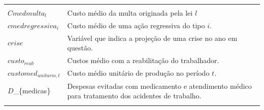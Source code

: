 \documentclass[]{article}
\begin{document}
\begin{longtable}[]{@{}ll@{}}
\begin{minipage}[t]{0.87\columnwidth}
\end{minipage}\tabularnewline
\begin{minipage}[t]{0.07\columnwidth}\raggedright\strut
\(Cmedmulta_{l}\)\strut
\end{minipage} & \begin{minipage}[t]{0.87\columnwidth}\raggedright\strut
Custo médio da multa originada pela lei \(l\)\strut
\end{minipage}\tabularnewline
\begin{minipage}[t]{0.07\columnwidth}\raggedright\strut
\(cmedregressiva_{i}\)\strut
\end{minipage} & \begin{minipage}[t]{0.87\columnwidth}\raggedright\strut
Custo médio de uma ação regressiva do tipo \(i\).\strut
\end{minipage}\tabularnewline
\begin{minipage}[t]{0.07\columnwidth}\raggedright\strut
\(crise\)\strut
\end{minipage} & \begin{minipage}[t]{0.87\columnwidth}\raggedright\strut
Variável que indica a projeção de uma crise no ano em questão.\strut
\end{minipage}\tabularnewline
\begin{minipage}[t]{0.07\columnwidth}\raggedright\strut
\(custo_{reab}\)\strut
\end{minipage} & \begin{minipage}[t]{0.87\columnwidth}\raggedright\strut
Custos médio com a reabilitação do trabalhador.\strut
\end{minipage}\tabularnewline
\begin{minipage}[t]{0.07\columnwidth}\raggedright\strut
\(customed_{unitario, t}\)\strut
\end{minipage} & \begin{minipage}[t]{0.87\columnwidth}\raggedright\strut
Custo médio unitário de produção no período \(t\).\strut
\end{minipage}\tabularnewline
\begin{minipage}[t]{0.07\columnwidth}\raggedright\strut
\(D\)\_\{medicas\}\strut
\end{minipage} & \begin{minipage}[t]{0.87\columnwidth}\raggedright\strut
Despesas evitadas com medicamento e atendimento médico para tratamento
dos acidentes de trabalho.\strut
\end{minipage}\tabularnewline
\begin{minipage}[t]{0.07\columnwidth}\raggedright\strut

\end{minipage}
\end{longtable}
\end{document}
